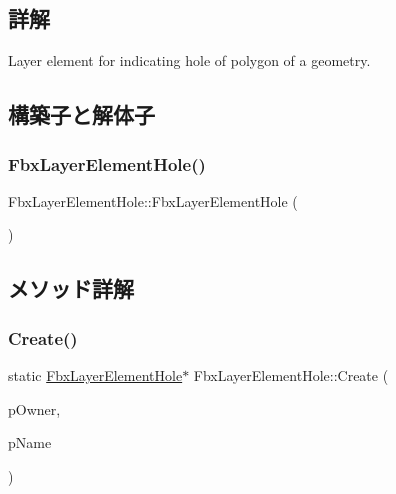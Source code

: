 \subsection{詳解}
Layer element for indicating hole of polygon of a geometry. 

\subsection{構築子と解体子}
\mbox{\label{class_fbx_layer_element_hole_aa16cc2aabce4cbb8b03dd1206778a30f}} 
\subsubsection{\texorpdfstring{Fbx\+Layer\+Element\+Hole()}{FbxLayerElementHole()}}
{\footnotesize\ttfamily Fbx\+Layer\+Element\+Hole\+::\+Fbx\+Layer\+Element\+Hole (\begin{DoxyParamCaption}{ }\end{DoxyParamCaption})\hspace{0.3cm}{\ttfamily [protected]}}



\subsection{メソッド詳解}
\mbox{\label{class_fbx_layer_element_hole_ae2e9be9ff1db47440c55d72f00f4ef61}} 
\subsubsection{\texorpdfstring{Create()}{Create()}}
{\footnotesize\ttfamily static \hyperlink{class_fbx_layer_element_hole}{Fbx\+Layer\+Element\+Hole}$\ast$ Fbx\+Layer\+Element\+Hole\+::\+Create (\begin{DoxyParamCaption}\item[{\hyperlink{class_fbx_layer_container}{Fbx\+Layer\+Container} $\ast$}]{p\+Owner,  }\item[{const char $\ast$}]{p\+Name }\end{DoxyParamCaption})\hspace{0.3cm}{\ttfamily [static]}}

